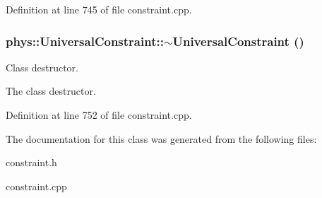 Definition at line 745 of file constraint.cpp.

\hypertarget{classphys_1_1UniversalConstraint_aba3078f0f19a1a66c330d96f278e6fd8}{
\subsubsection[{$\sim$UniversalConstraint}]{\setlength{\rightskip}{0pt plus 5cm}phys::UniversalConstraint::$\sim$UniversalConstraint ()}}
\label{d0/d09/classphys_1_1UniversalConstraint_aba3078f0f19a1a66c330d96f278e6fd8}


Class destructor. 

The class destructor. 

Definition at line 752 of file constraint.cpp.



The documentation for this class was generated from the following files:\begin{DoxyCompactItemize}
\item 
constraint.h\item 
constraint.cpp\end{DoxyCompactItemize}
